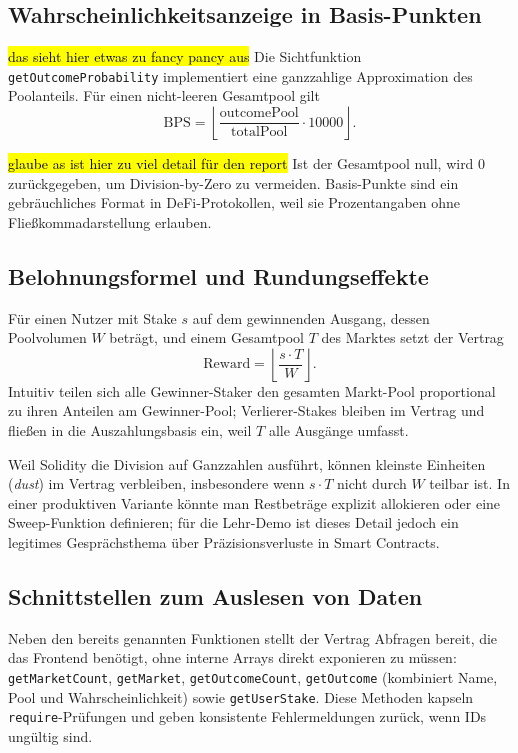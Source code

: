 \subsection{Wahrscheinlichkeitsanzeige in Basis-Punkten}

\hl{das sieht hier etwas zu fancy pancy aus }
Die Sichtfunktion \texttt{getOutcomeProbability} implementiert eine
ganzzahlige Approximation des Poolanteils. Für einen nicht-leeren Gesamtpool gilt
\[
  \text{BPS} = \left\lfloor \frac{\text{outcomePool}}{\text{totalPool}} \cdot 10000 \right\rfloor .
\]

\hl{glaube as ist hier zu viel detail für den report}
Ist der Gesamtpool null, wird 0 zurückgegeben, um Division-by-Zero zu vermeiden.
Basis-Punkte sind ein gebräuchliches Format in DeFi-Protokollen, weil sie
Prozentangaben ohne Fließkommadarstellung erlauben.

\subsection{Belohnungsformel und Rundungseffekte}

Für einen Nutzer mit Stake $s$ auf dem gewinnenden Ausgang, dessen Poolvolumen
$W$ beträgt, und einem Gesamtpool $T$ des Marktes setzt der Vertrag
\begin{equation*}
  \text{Reward} = \left\lfloor \frac{s \cdot T}{W} \right\rfloor .
\end{equation*}
Intuitiv teilen sich alle Gewinner-Staker den gesamten Markt-Pool proportional zu
ihren Anteilen am Gewinner-Pool; Verlierer-Stakes bleiben im Vertrag und fließen
in die Auszahlungsbasis ein, weil $T$ alle Ausgänge umfasst.

Weil Solidity die Division auf Ganzzahlen ausführt, können kleinste Einheiten
(\emph{dust}) im Vertrag verbleiben, insbesondere wenn $s \cdot T$ nicht durch
$W$ teilbar ist. In einer produktiven Variante könnte man Restbeträge explizit
allokieren oder eine Sweep-Funktion definieren; für die Lehr-Demo ist dieses
Detail jedoch ein legitimes Gesprächsthema über Präzisionsverluste in
Smart Contracts.

\subsection{Schnittstellen zum Auslesen von Daten}

Neben den bereits genannten Funktionen stellt der Vertrag Abfragen bereit, die
das Frontend benötigt, ohne interne Arrays direkt exponieren zu müssen:
\texttt{getMarketCount}, \texttt{getMarket}, \texttt{getOutcomeCount},
\texttt{getOutcome} (kombiniert Name, Pool und Wahrscheinlichkeit) sowie
\texttt{getUserStake}. Diese Methoden kapseln \texttt{require}-Prüfungen und
geben konsistente Fehlermeldungen zurück, wenn IDs ungültig sind.


